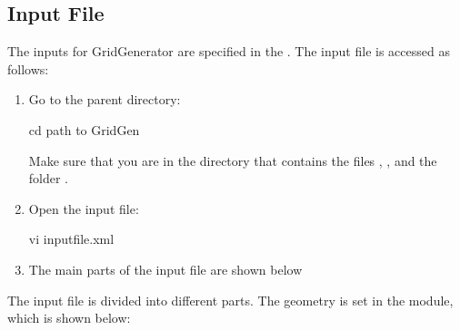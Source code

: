 \documentclass[letterpaper,10pt,english]{sphinxmanual}
\begin{document}
\subsection{Input File}
\label{\detokenize{setup:input}}\label{\detokenize{setup:input-file}}
The inputs for GridGenerator are specified in the . The input file is accessed as follows:
\begin{enumerate}
\item {} 
Go to the parent directory:

\begin{sphinxVerbatim}[commandchars=\\\{\}]
\PYGZdl{} cd \PYGZlt{}path to \textbar{}GridGen\textbar{}\PYGZgt{}
\end{sphinxVerbatim}

Make sure that you are in the directory that contains the files , , and the folder .

\item {} 
Open the input file:

\begin{sphinxVerbatim}[commandchars=\\\{\}]
\PYGZdl{} vi input\PYGZus{}file.xml
\end{sphinxVerbatim}

\item {} 
The main parts of the input file are shown below

\end{enumerate}

The input file is divided into different parts. The geometry is set in the  module, which is shown below:
\end{document}
